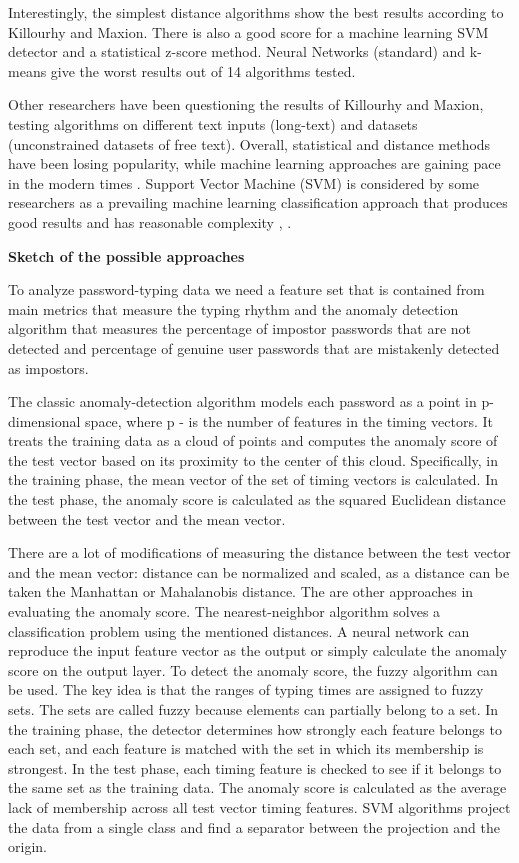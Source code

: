 \documentclass[12pt,a4]{article}
\begin{document}
Interestingly, the simplest distance algorithms show the best results according to Killourhy and Maxion. There is also a good score for a machine learning SVM detector and a statistical z-score method. Neural Networks (standard) and k-means give the worst results out of 14 algorithms tested.

Other researchers have been questioning the results of Killourhy and Maxion, testing algorithms on different text inputs (long-text) and datasets (unconstrained datasets of free text). Overall, statistical and distance methods have been losing popularity, while machine learning approaches are gaining pace in the modern times \cite{Liakat:2017}. Support Vector Machine (SVM) is  considered by some researchers as a prevailing machine learning classification approach that produces good results and has reasonable complexity \cite{Liakat:2017}, \cite{raul2020comprehensive}.

\bigskip
\large\textbf{Sketch of the possible approaches }
\bigskip

\normalsize
To analyze password-typing data we need a feature set that is contained from main metrics that measure the typing rhythm and the anomaly detection algorithm that measures the percentage of impostor passwords that are not detected and percentage of genuine user passwords that are mistakenly detected as impostors.  

The classic anomaly-detection algorithm \cite{duda2001_patternClass} models each password as a point in p-dimensional space, where p - is the number of features in the timing vectors. It treats the training data as a cloud of points and computes the anomaly score of the test vector based on its proximity to the center of this cloud. Specifically, in the training phase, the mean vector of the set of timing vectors is calculated. In the test phase, the anomaly score is calculated as the squared Euclidean distance between the test vector and the mean vector.

There are a lot of modifications of measuring the distance between the test vector and the mean vector: distance can be normalized and scaled, as a distance can be taken the Manhattan or Mahalanobis distance. 
The are other approaches in evaluating the anomaly score. The nearest-neighbor algorithm solves a classification problem using the mentioned distances. A neural network can reproduce the input feature vector as the output or simply calculate the anomaly score on the output layer. To detect the anomaly score, the fuzzy algorithm can be used. The key idea is that the ranges of typing times are assigned to fuzzy sets. The sets are called fuzzy because elements can partially belong to a set. In the training phase, the detector determines how strongly each feature belongs to each set, and each feature is matched with the set in which its membership is strongest. In the test phase, each timing feature is checked to see if it belongs to the same set as the training data. The anomaly score is calculated as the average lack of membership across all test vector timing features. SVM algorithms project the data from a single class and find a separator between the projection and the origin.
\end{document}
